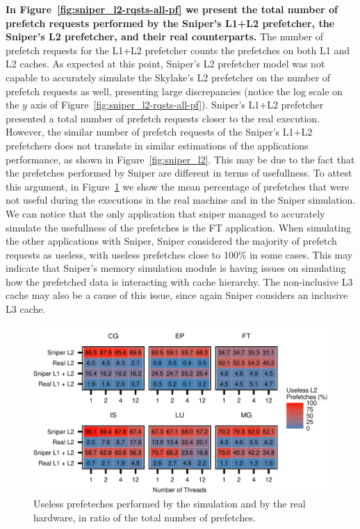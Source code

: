 \documentclass[AMA,final,STIX1COL]{WileyNJD-v2}
\newcommand\new[1]{{\color{red}\textbf{#1}}}
\begin{document}
\new{In Figure~\ref{fig:sniper_l2-rqsts-all-pf} we present the total number of prefetch requests performed by the Sniper's L1+L2 prefetcher, the Sniper's L2 prefetcher, and their real counterparts.} The number of prefetch requests for the L1+L2 prefetcher counts the prefetches on both L1 and L2 caches.
As expected at this point, Sniper's L2 prefetcher model was not capable to accurately simulate the Skylake's L2 prefetcher on the number of prefetch requests as well, presenting large discrepancies (notice the log scale on the $y$ axis of Figure~\ref{fig:sniper_l2-rqsts-all-pf}).
Sniper's L1+L2 prefetcher presented a total number of prefetch requests closer to the real execution. 
However, the similar number of prefetch requests of the Sniper's L1+L2 prefetchers does not translate in similar estimations of the applications performance, as shown in Figure~\ref{fig:sniper_l2}.
This may be due to the fact that the prefetches performed by Sniper are different in terms of usefullness. 
To attest this argument, in Figure~\ref{fig:sniper_useless_pf_ratio} we show the mean percentage of prefetches that were not useful during the executions in the real machine and in the Sniper simulation.
We can notice that the only application that sniper managed to accurately simulate the usefullness of the prefetches is the FT application.
When simulating the other applications with Sniper, Sniper considered the majority of prefetch requests as useless, with useless prefetches close to 100\% in some cases. 
This may indicate that Sniper's memory simulation module is having issues on simulating how the prefetched data is interacting with cache hierarchy. 
The non-inclusive L3 cache may also be a cause of this issue, since again Sniper considers an inclusive L3 cache.


\begin{figure}
    \centering
    \includegraphics[width=\linewidth]{figures/useless-l2-prefetches-real-sim.pdf}
    \caption{Useless prefeteches performed by the simulation and by the real hardware, in ratio of the total number of prefetches.}
    \label{fig:sniper_useless_pf_ratio}
\end{figure}
\end{document}
